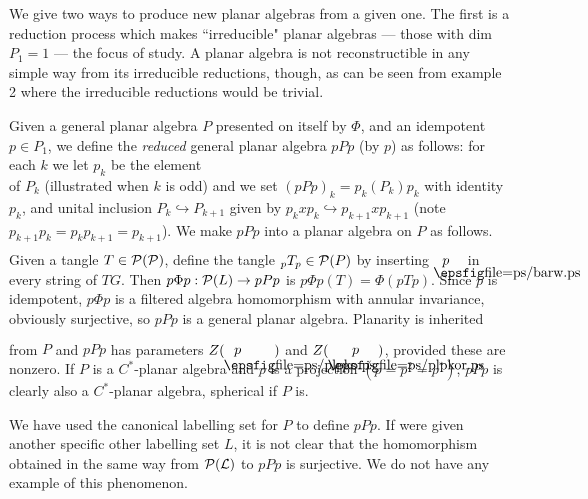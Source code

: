 
\bs\bs{}

We give two ways to produce new planar algebras from a given one.
The first is a reduction process which makes ``irreducible" planar
algebras --- those with dim $P_1=1$ --- the focus of study.
A planar algebra is not reconstructible in any simple way from its
irreducible reductions, though, as can be seen from example 2
where the irreducible reductions would be trivial.

Given a general planar algebra $P$ presented on itself by $\Phi$,
and an idempotent $p\in  P_1$, we define the {\it reduced} general
planar algebra $pPp$ (by $p$) as follows: for each $k$ we let
$p_k$ be the element
\[
        
\]
\ni of $P_k$ (illustrated when $k$ is odd) and we set
$(pPp)_k =p_k(P_k)p_k$ with identity $p_k$, and unital
inclusion  $P_k\hookrightarrow P_{k+1}$ given by
$p_kxp_k\hookrightarrow p_{k+1}xp_{k+1}$ (note
$p_{k+1}p_k=p_kp_{k+1}=p_{k+1}$). We make $pPp$ into a planar
algebra on $P$ as follows. Given a tangle $T\in{\cal P(P)}$, define
the tangle ${}_pT_p\in {\cal P}(P)$ by inserting  $\boxa{p}$ in
every string of $TG$. Then
$p\Phi p:{\cal P}(L)\to pPp$ is $p\Phi p(T)=\Phi(pTp)$.
Since $p$ is idempotent, $p\Phi p$ is a filtered algebra
homomorphism with annular invariance, obviously surjective, so
$pPp$ is a general planar algebra. Planarity is inherited from $P$
and $pPp$ has parameters
$Z(\blrighto{p}\ )$ and $Z(\bllefto{p}\ )$, provided these
are nonzero. If $P$ is a $C^*$-planar algebra and $p$ is a
projection
$(p=p^2=p^*)$, $pPp$ is clearly also a $C^*$-planar algebra,
spherical if $P$ is.

 We have used the canonical labelling set for $P$
to define $pPp$. If were given another specific
other labelling set $L$, it is not clear that the homomorphism
obtained in the same way from $\cal P(L)$ to $pPp$ is surjective. We
do not have any example of this phenomenon.



